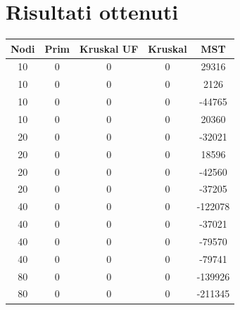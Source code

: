 \documentclass[a4paper]{article}
\begin{document}
\section{Risultati ottenuti}
\begin{table}[H]
  \begin{minipage}[t]{10cm}
    \vspace{0pt}
    \begin{tabular}{|c|c|c|c|c|}
      \rowcolor{gray!50}
      \hline
      \textbf{Nodi} & \textbf{Prim} & \textbf{Kruskal UF} & \textbf{Kruskal} & \textbf{MST} \\ \hline
      10            & 0             & 0                   & 0                & 29316        \\ \hline
      10            & 0             & 0                   & 0                & 2126         \\ \hline
      10            & 0             & 0                   & 0                & -44765       \\ \hline
      10            & 0             & 0                   & 0                & 20360        \\ \hline
      20            & 0             & 0                   & 0                & -32021       \\ \hline
      20            & 0             & 0                   & 0                & 18596        \\ \hline
      20            & 0             & 0                   & 0                & -42560       \\ \hline
      20            & 0             & 0                   & 0                & -37205       \\ \hline
      40            & 0             & 0                   & 0                & -122078      \\ \hline
      40            & 0             & 0                   & 0                & -37021       \\ \hline
      40            & 0             & 0                   & 0                & -79570       \\ \hline
      40            & 0             & 0                   & 0                & -79741       \\ \hline
      80            & 0             & 0                   & 0                & -139926      \\ \hline
      80            & 0             & 0                   & 0                & -211345      \\ \hline

\end{tabular}
\end{minipage}
\end{table}
\end{document}
